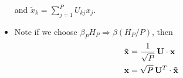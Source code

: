 \begin{frame}
\begin{multicols}{2}
\begin{itemize}
            and $\tilde{x}_k = \sum_{j=1}^P U_{kj}x_j$.
          \item Note if we choose $\beta_P H_P \Rightarrow \beta (H_P/P)$, then
            \begin{align*}
                \mathbf{\tilde{x}} &= \frac{1}{\sqrt{P}} \,\mathbf{U} \cdot
                                     \mathbf{x} \cr
                \mathbf{x} &= \sqrt{P} \,\mathbf{U}^T \cdot
                                     \mathbf{\tilde{x}}
            \end{align*}
            

    \end{itemize}
    
  \end{multicols}

            

            

\end{frame}
